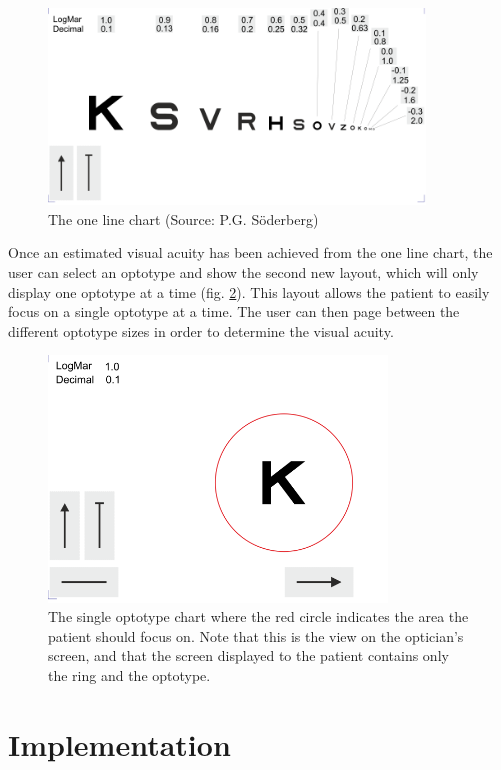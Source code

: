\documentclass[12pt,a4paper,notitlepage]{report}
\begin{document}
\begin{figure}[ht!]
\centering
\includegraphics[width=100mm]{images/etdrs_one_line.png}
\caption[One-line eye chart]{The one line chart (Source: P.G. Söderberg)}
\label{fig:etdrs_one_line}
\end{figure}

\pagebreak
Once an estimated visual acuity has been achieved from the one line chart, the user can select an optotype and show the second new layout, which will only display one optotype at a time (fig. \ref{fig:etdrs_single}). This layout allows the patient to easily focus on a single optotype at a time. The user can then page between the different optotype sizes in order to determine the visual acuity.

\begin{figure}[ht!  ]
\centering
\includegraphics[width=90mm]{images/etdrs_single.png}
\caption[Single optotype chart]{The single optotype chart where the red circle indicates the area the patient should focus on. Note that this is the view on the optician's screen, and that the screen displayed to the patient contains only the ring and the optotype.}
\label{fig:etdrs_single}
\end{figure}

\chapter{ Implementation}
\end{document}
